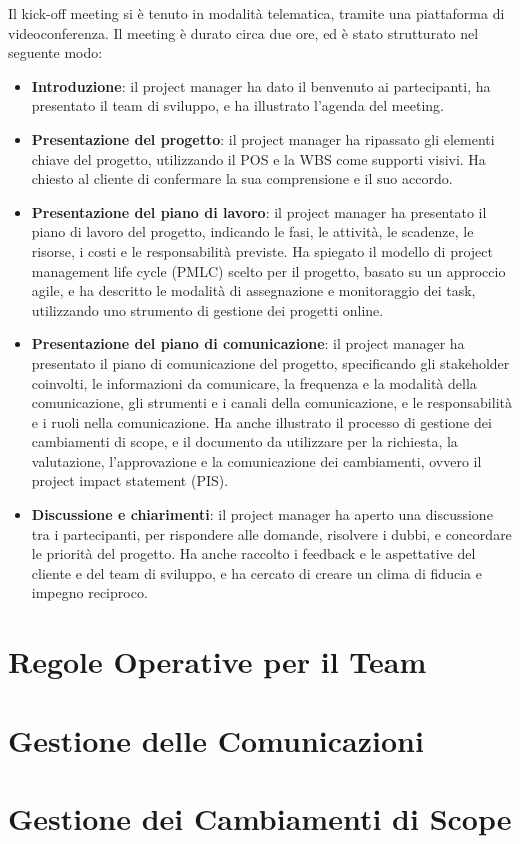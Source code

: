 Il kick-off meeting si è tenuto in modalità telematica, tramite una piattaforma di videoconferenza. Il meeting è durato circa due ore, ed è stato strutturato nel seguente modo:

\begin{itemize}
    \item \textbf{Introduzione}: il project manager ha dato il benvenuto ai partecipanti, ha presentato il team di sviluppo, e ha illustrato l'agenda del meeting.
    \item \textbf{Presentazione del progetto}: il project manager ha ripassato gli elementi chiave del progetto, utilizzando il POS e la WBS come supporti visivi. Ha chiesto al cliente di confermare la sua comprensione e il suo accordo.
    \item \textbf{Presentazione del piano di lavoro}: il project manager ha presentato il piano di lavoro del progetto, indicando le fasi, le attività, le scadenze, le risorse, i costi e le responsabilità previste. Ha spiegato il modello di project management life cycle (PMLC) scelto per il progetto, basato su un approccio agile, e ha descritto le modalità di assegnazione e monitoraggio dei task, utilizzando uno strumento di gestione dei progetti online.
    \item \textbf{Presentazione del piano di comunicazione}: il project manager ha presentato il piano di comunicazione del progetto, specificando gli stakeholder coinvolti, le informazioni da comunicare, la frequenza e la modalità della comunicazione, gli strumenti e i canali della comunicazione, e le responsabilità e i ruoli nella comunicazione. Ha anche illustrato il processo di gestione dei cambiamenti di scope, e il documento da utilizzare per la richiesta, la valutazione, l'approvazione e la comunicazione dei cambiamenti, ovvero il project impact statement (PIS).
    \item \textbf{Discussione e chiarimenti}: il project manager ha aperto una discussione tra i partecipanti, per rispondere alle domande, risolvere i dubbi, e concordare le priorità del progetto. Ha anche raccolto i feedback e le aspettative del cliente e del team di sviluppo, e ha cercato di creare un clima di fiducia e impegno reciproco.
\end{itemize}

\section{Regole Operative per il Team}

\section{Gestione delle Comunicazioni}

\section{Gestione dei Cambiamenti di Scope}
